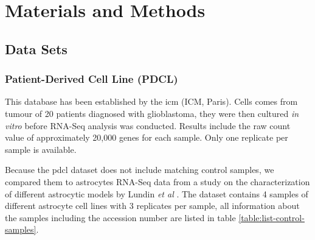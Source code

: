 \section{Materials and Methods}

\subsection{Data Sets}

\subsubsection{Patient-Derived Cell Line (PDCL)}

This database has been established by the \acrlong{icm} (ICM, Paris).
Cells comes from tumour of 20 patients diagnosed with glioblastoma, they were then cultured \textit{in vitro} before RNA-Seq analysis was conducted.
Results include the raw count value of approximately 20,000 genes for each sample.
Only one replicate per sample is available.

Because the \acrshort{pdcl} dataset does not include matching control samples, we compared them to astrocytes RNA-Seq data from a study on the characterization of different astrocytic models by Lundin \textit{et al} \cite*{Lundin2018}.
The dataset contains 4 samples of different astrocyte cell lines with 3 replicates per sample, all information about the samples including the accession number are listed in table \ref*{table:list-control-samples}.

